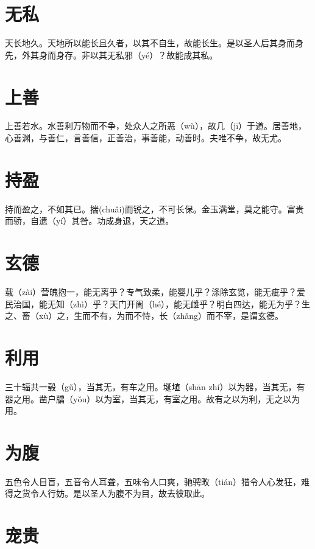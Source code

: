 \documentclass[a4paper,12pt,UTF8,twoside]{ctexbook}
\begin{document}
	
	
	
	
	\chapter{无私}
	天长地久。天地所以能长且久者，以其不自生，故能长生。是以圣人后其身而身先，外其身而身存。非以其无私邪（yé）？故能成其私。
	
	
	
	
	\chapter{上善}
	上善若水。水善利万物而不争，处众人之所恶（wù），故几（jī）于道。居善地，心善渊，与善仁，言善信，正善治，事善能，动善时。夫唯不争，故无尤。
	
	
	\chapter{持盈}
	
	持而盈之，不如其已。揣(chuǎi)而锐之，不可长保。金玉满堂，莫之能守。富贵而骄，自遗（yí）其咎。功成身退，天之道。	

	\chapter{玄德}
		
	载（zài）营魄抱一，能无离乎？专气致柔，能婴儿乎？涤除玄览，能无疵乎？爱民治国，能无知（zhì）乎？天门开阖（hé），能无雌乎？明白四达，能无为乎？生之、畜（xù）之，生而不有，为而不恃，长（zhǎng）而不宰，是谓玄德。
	
	\chapter{利用}
	
	三十辐共一毂（gǔ），当其无，有车之用。埏埴（shān zhí）以为器，当其无，有器之用。凿户牖（yǒu）以为室，当其无，有室之用。故有之以为利，无之以为用。
	
	\chapter{为腹}
	
	五色令人目盲，五音令人耳聋，五味令人口爽，驰骋畋（tián）猎令人心发狂，难得之货令人行妨。是以圣人为腹不为目，故去彼取此。
	
	\chapter{宠贵}
	
\end{document}
